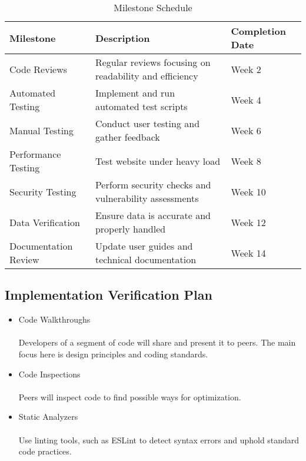 \documentclass[12pt, titlepage]{article}
\begin{document}
\begin{table}[h]
    \centering
    \begin{tabular}{|l|l|l|}
        \hline
        \textbf{Milestone}   & \textbf{Description}                                   & \textbf{Completion Date} \\ \hline
        Code Reviews         & Regular reviews focusing on readability and efficiency & Week 2                   \\ \hline
        Automated Testing    & Implement and run automated test scripts               & Week 4                   \\ \hline
        Manual Testing       & Conduct user testing and gather feedback               & Week 6                   \\ \hline
        Performance Testing  & Test website under heavy load                          & Week 8                   \\ \hline
        Security Testing     & Perform security checks and vulnerability assessments  & Week 10                  \\ \hline
        Data Verification    & Ensure data is accurate and properly handled           & Week 12                  \\ \hline
        Documentation Review & Update user guides and technical documentation         & Week 14                  \\ \hline
    \end{tabular}
    \caption{Milestone Schedule}
\end{table}



\subsection{Implementation Verification Plan}

\begin{itemize}
    \item Code Walkthroughs
          \\ \\ Developers of a segment of code will share and present it to peers. The main focus here is design principles and coding standards.

    \item Code Inspections
          \\ \\ Peers will inspect code to find possible ways for optimization.

    \item Static Analyzers
          \\ \\ Use linting tools, such as ESLint to detect syntax errors and uphold standard code practices.
\end{itemize}
\end{document}
